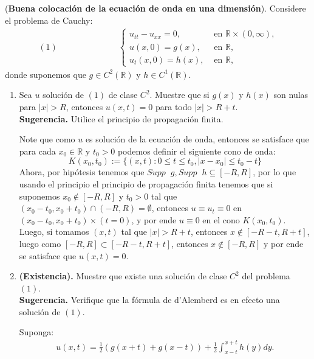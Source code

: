 \begin{homeworkProblem}
  (\textbf{Buena colocación de la ecuación de onda en una dimensión}). Considere el problema de Cauchy:
  \begin{align*}
    (1)\hspace{3cm}\begin{cases}
      u_{tt}-u_{xx}=0, &\text{ en } \mathbb{R}\times (0,\infty) \text{,} \\
      u(x,0)=g(x), &\text{ en }\mathbb{R} \text{,}\\
      u_{t}(x,0)=h(x), &\text{ en }\mathbb{R} \text{,}
    \end{cases}
  \end{align*}
  donde suponemos que $g\in C^2(\mathbb{R})$ y $h\in C^{1}(\mathbb{R})$.
  \begin{enumerate}[i]
    \item Sea $u$ solución de $(1)$ de clase $C^2$. Muestre que si $g(x)$ y $h(x)$ son nulas para $|x|>R$, entonces $u(x,t)=0$ para todo $|x|>R+t$.\\
    \textbf{Sugerencia.} Utilice el principio de propagación finita.
      \begin{solucion}
        Note que como $u$ es solución de la ecuación de onda, entonces se satisface que para cada $x_0\in\mathbb{R}$ y $t_0>0$ podemos definir el siguiente cono de onda:
        $$K(x_0,t_0):=\{(x,t):0\leq t\leq t_0, |x-x_0|\leq t_0-t\}$$
        Ahora, por hipótesis tenemos que $Supp\phantom{x}g, Supp\phantom{x}h \subseteq [-R,R]$, por lo que usando el principio el principio de propagación finita tenemos que si suponemos $x_0\notin [-R,R]$ y $t_0>0$ tal que $(x_0-t_0,x_0+t_0)\cap(-R,R)=\emptyset$, entonces $u\equiv u_t\equiv 0$ en $(x_0-t_0,x_0+t_0)\times (t=0)$, y por ende $u\equiv 0$ en el cono $K(x_0,t_0)$.\\
        Luego, si tomamos $(x,t)$ tal que $|x|>R+t$, entonces $x\notin [-R-t,R+t]$, luego como $[-R,R]\subset[-R-t,R+t]$, entonces $x\notin [-R,R]$ y por ende se satisface que $u(x,t)=0$.
        \demostrado
      \end{solucion}
    \item \textbf{(Existencia).} Muestre que existe una solución de clase $C^2$ del problema $(1)$.\\
    \textbf{Sugerencia.} Verifique que la fórmula de d'Alemberd es en efecto una solución de $(1)$.
      \begin{solucion}
        Suponga:
        \begin{align*}
          u(x,t)=\frac{1}{2}\left( g(x+t)+g(x-t) \right)+\frac{1}{2}\int_{x-t}^{x+t}h(y)dy.

\end{align*}
\end{solucion}
\end{enumerate}
\end{homeworkProblem}
